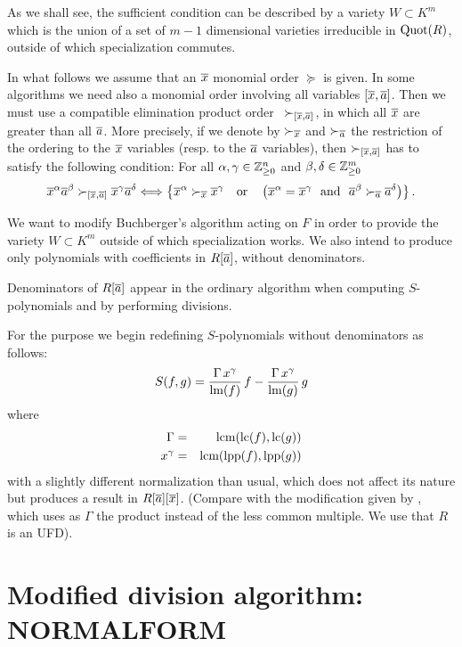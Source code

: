 As we shall see, the sufficient condition can be described by a
variety $W \subset K^m$ which is the union of a set of $m-1$
dimensional varieties irreducible in $\hbox{\rm Quot}(R)$, outside of which
specialization commutes.

In what follows we assume that an $\overline{x}$ monomial order $\succeq$
is given. In some algorithms we need also a monomial order
involving all variables $[\overline{x},\overline{a}]$. Then we must use a compatible
elimination product order~\cite{BaSt} $\succ_{[\overline{x},\overline{a}]}$, in
which all $\overline{x}$ are greater than all $\overline{a}$. More precisely, if we
denote by $\succ_{\overline{x}}$ and $\succ_{\overline{a}}$ the restriction of the
ordering to the $\overline{x}$ variables (resp. to the $\overline{a}$ variables),
then $\succ_{[\overline{x},\overline{a}]}$ has to satisfy the following condition:
For all $\alpha,\gamma \in {\mathbb{Z}}^n_{\ge 0}$ and $\beta,\delta \in
{\mathbb{Z}}^m_{\ge 0}$
\[ \overline{x}^\alpha \overline{a}^\beta \succ_{[\overline{x},\overline{a}]} \overline{x}^\gamma \overline{a}^\delta
\Longleftrightarrow \left\{ \overline{x}^\alpha \succ_{\overline{x}} \overline{x}^\gamma \ \
\hbox{ or } \ \ \left( \overline{x}^\alpha = \overline{x}^\gamma \ \hbox{ and } \
\overline{a}^\beta \succ_{\overline{a}} \overline{a}^\delta \right)\right\}.
\]

We want to modify Buchberger's algorithm acting on $F$ in order to
provide the variety $W \subset K^m$ outside of which
specialization works. We also intend to produce only polynomials
with coefficients in $R[\overline{a}]$, without denominators.

Denominators of $R[\overline{a}]$ appear in the ordinary algorithm
when computing $S$-poly\-no\-mials and by performing divisions.

For the purpose we begin redefining $S$-polynomials without
denominators as follows:
  \begin{equation} \label{spol}
  S(f,g) = \frac{\Gamma\, x^{\gamma}}{\hbox{\rm lm}(f)}\, f
  - \frac{\Gamma\, x^{\gamma}}{\hbox{\rm lm}(g)}\,  g
  \end{equation}
  where
  \begin{eqnarray*}
  \Gamma&=&\hbox{lcm}(\hbox{\rm lc}(f),\hbox{\rm lc}(g)) \nonumber\\
  x^{\gamma}&=&\hbox{lcm}(\hbox{\rm lpp}(f),\hbox{\rm lpp}(g)) \nonumber\\
  \end{eqnarray*}
with a slightly different normalization than usual, which does not
affect its nature but produces a result in $R[\overline{a}][\overline{x}]$. (Compare
with the modification given by \ccite{Weis92}, which uses as
$\Gamma$ the product instead of the less common multiple. We use
that $R$ is an UFD).

  \section{Modified division algorithm: NORMALFORM} \label{div}

